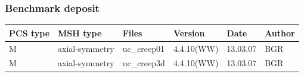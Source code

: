 \subsubsection*{Benchmark deposit}

\begin{tabular}{|l|l|l|l|l|l|}
\hline
PCS type & MSH type       & Files     & Version    & Date    & Author\\
\hline
M       & axial-symmetry & uc\_creep01 & 4.4.10(WW) & 13.03.07 & BGR \\
\hline
M       & axial-symmetry & uc\_creep3d & 4.4.10(WW) & 13.03.07 & BGR \\
\hline
\end{tabular}
